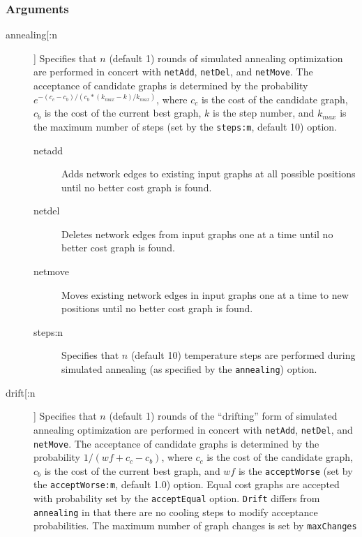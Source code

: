 	\subsubsection{Arguments}
		
		\begin{description}
		\item[annealing[:n]] Specifies that $n$ (default 1) rounds of simulated annealing optimization 
		\citep{Metropolisetal1953, Kirkpatricketal1983, Cerny1985} are performed in concert with 
		\texttt{netAdd}, \texttt{netDel}, and \texttt{netMove}. The acceptance of candidate graphs is 
		determined by the probability $e ^ {- (c_c - c_b)/ (c_b * (k_{max} -k)/ k_{max})}$, where $c_c$ 
		is the cost of the candidate graph, $c_b$ is the cost of the current best graph, $k$ is the step 
		number, and $k_{max}$ is the maximum number of steps (set by the \texttt{steps:m}, default 10) 
		option.
		
			\begin{description}
		
			\item[netadd] Adds network edges to existing input graphs at all possible positions until no 
			better cost graph is found.
			
			\item[netdel] Deletes network edges from input graphs one at a time until no better cost 
			graph is found.
			
			\item[netmove] Moves existing network edges in input graphs one at a time to new positions 
			until no better cost graph 
			is found.
			
			\item[steps:n] Specifies that $n$ (default 10) temperature steps are performed during 
			simulated 
			annealing (as specified by the \texttt{annealing}) option.

			\end{description}

			
		\item[drift[:n]] Specifies that $n$ (default 1) rounds of the ``drifting'' form of simulated annealing 
		\citep{goloboff1999} optimization are performed in concert with \texttt{netAdd}, 	\texttt{netDel}, 
		and \texttt{netMove}. The acceptance of candidate graphs is determined by the probability 
		$1/ (wf + c_c - c_b)$, where $c_c$ is the cost of the candidate graph, $c_b$ is the cost of the 
		current best graph, and $wf$ is the \texttt{acceptWorse} (set by the \texttt{acceptWorse:m}, 
		default 1.0) option. Equal cost graphs are accepted with probability set by the \texttt{acceptEqual} 
		option. \texttt{Drift} differs from \texttt{annealing} in that there are no cooling steps to modify 
		acceptance probabilities. The maximum number of graph changes is set by \texttt{maxChanges}
			

\end{description}
